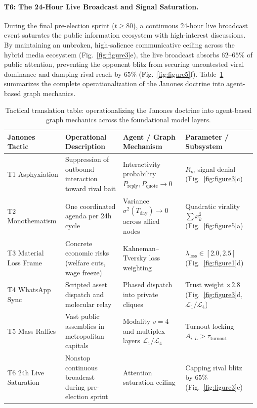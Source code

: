 \documentclass{article}
\begin{document}
\paragraph{T6: The 24-Hour Live Broadcast and Signal Saturation.}
During the final pre-election sprint ($t \ge 80$), a continuous 24-hour live broadcast event saturates the public information ecosystem with high-interest discussions. By maintaining an unbroken, high-salience communicative ceiling across the hybrid media ecosystem (Fig.~\ref{fig:figure3}e), the live broadcast absorbs $62\text{--}65\%$ of public attention, preventing the opponent blitz from securing uncontested viral dominance and damping rival reach by $65\%$ (Fig.~\ref{fig:figure5}f). Table~\ref{tab:janones_tactics} summarizes the complete operationalization of the Janones doctrine into agent-based graph mechanics.

\begin{table}[htbp]
\centering
\caption{Tactical translation table: operationalizing the Janones doctrine into agent-based graph mechanics across the foundational model layers.}
\label{tab:janones_tactics}
\footnotesize
\setlength{\tabcolsep}{4pt}
\begin{tabular}{lp{4.2cm}p{3.8cm}p{2.8cm}}
\toprule
\textbf{Janones Tactic} & \textbf{Operational Description} & \textbf{Agent / Graph Mechanism} & \textbf{Parameter / Subsystem} \\
\midrule
T1 Asphyxiation & Suppression of outbound interaction toward rival bait & Interactivity probability $P_{\mathrm{reply}}, P_{\mathrm{quote}} \to 0$ & $R_m$ signal denial (Fig.~\ref{fig:figure3}c) \\
T2 Monothematism & One coordinated agenda per 24h cycle & Variance $\sigma^2(T_{\mathrm{day}}) \to 0$ across allied nodes & Quadratic virality $\sum x_k^2$ (Fig.~\ref{fig:figure5}a) \\
T3 Material Loss Frame & Concrete economic risks (welfare cuts, wage freeze) & Kahneman--Tversky loss weighting & $\lambda_{\mathrm{loss}} \in [2.0, 2.5]$ (Fig.~\ref{fig:figure1}d) \\
T4 WhatsApp Sync & Scripted asset dispatch and molecular relay & Phased dispatch into private cliques & Trust weight $\times 2.8$ (Fig.~\ref{fig:figure3}d, $\mathcal{L}_1/\mathcal{L}_4$) \\
T5 Mass Rallies & Vast public assemblies in metropolitan capitals & Modality $v=4$ and multiplex layers $\mathcal{L}_1/\mathcal{L}_4$ & Turnout locking $A_{i,L} > \tau_{\mathrm{turnout}}$ \\
T6 24h Live Saturation & Nonstop continuous broadcast during pre-election sprint & Attention saturation ceiling & Capping rival blitz by $65\%$ (Fig.~\ref{fig:figure3}e) \\
\bottomrule
\end{tabular}
\end{table}
\end{document}
